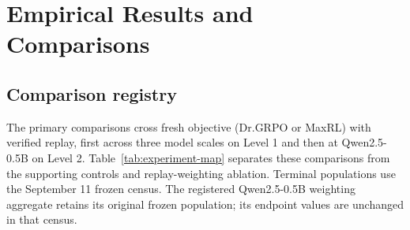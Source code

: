 \section{Empirical Results and Comparisons}
\label{app:supporting}
\label{app:aligned-xmode}

\subsection{Comparison registry}
\label{app:program-registry}

The primary comparisons cross fresh objective (Dr.GRPO or MaxRL) with
verified replay, first across three model scales on Level 1 and then at
Qwen2.5-0.5B on Level 2. Table~\ref{tab:experiment-map} separates these
comparisons from the supporting controls and replay-weighting ablation.
Terminal populations use the September 11 frozen census. The registered
Qwen2.5-0.5B weighting aggregate retains its original frozen population;
its endpoint values are unchanged in that census.

